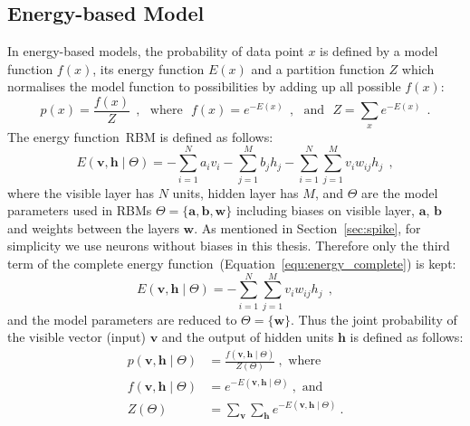 \subsection{Energy-based Model}
In energy-based models, the probability of data point $x$ is defined by a model function $f(x)$, its energy function $E(x)$ and a partition function $Z$ which normalises the model function to possibilities by adding up all possible $f(x)$:
\begin{equation}
 p(x) = \dfrac{f(x)}{Z}~~, \textrm{~~where~~} f(x) =e^{-E(x)}~~,  \textrm{~~and~~}
 Z = \sum_{x} e^{-E(x)}~~.
\end{equation} 
The energy function~\DIFdelbegin {}\DIFdelend \DIFaddbegin {}\DIFaddend RBM is defined as follows:
\begin{equation}
E(\mathbf{v}, \mathbf{h} \mid \Theta)= -\sum_{i=1}^N a_i v_i - \sum_{j=1}^M b_j h_j - \sum_{i=1}^N \sum_{j=1}^M v_i w_{ij} h_j~~,
\label{equ:energy_complete}
\end{equation}
where the visible layer has $ N $ units, \DIFaddbegin {}\DIFaddend hidden layer has $ M $, and $ \Theta$ are the model parameters used in RBMs $ \Theta =\{\mathbf{a}, \mathbf{b}, \mathbf{w}\} $ including biases on \DIFaddbegin {}\DIFaddend visible layer, $\mathbf{a}$, \DIFdelbegin {}\DIFdelend \DIFaddbegin {}\DIFaddend $\mathbf{b}$ \DIFdelbegin \DIFdel{, }\DIFdelend and weights between the layers $\mathbf{w}$.
As mentioned in Section~\ref{sec:spike}, for simplicity we use neurons without biases in this thesis.
Therefore only the third term of the complete energy function~(Equation~\ref{equ:energy_complete}) is kept:
\begin{equation}
E(\mathbf{v}, \mathbf{h} \mid \Theta)= - \sum_{i=1}^N \sum_{j=1}^M v_i w_{ij} h_j~~,
\label{equ:rbm_energy}
\end{equation}
and the model parameters are reduced to  $ \Theta = \{\mathbf{w}\} $.
Thus the joint probability of the visible vector (input) $\mathbf{v}$ and the output of \DIFaddbegin {}\DIFaddend hidden units $\mathbf{h}$ is defined as follows: 
\begin{equation}
\begin{aligned}
p(\mathbf{v}, \mathbf{h} \mid \Theta) &=\frac{f(\mathbf{v}, \mathbf{h} \mid \Theta)}{Z(\Theta)}~,  \textrm{~where~} \\
f(\mathbf{v}, \mathbf{h} \mid \Theta) &=e^{-E(\mathbf{v}, \mathbf{h} \mid \Theta)}~,  \textrm{~and~} \\
Z(\Theta) &= \sum_{\mathbf{v}} \sum_{\mathbf{h}} e^{-E(\mathbf{v}, \mathbf{h} \mid \Theta)}~.
\end{aligned}
\label{equ:rbm_prob}
\end{equation}
